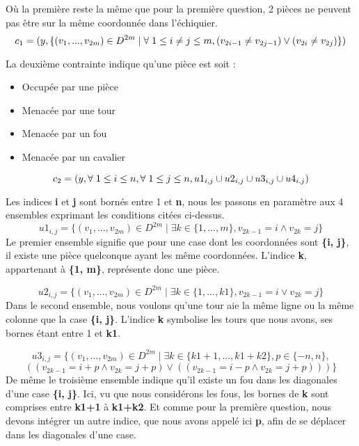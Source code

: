 \documentclass{article}
\begin{document}
Où la première reste la même que pour la première question, 2 pièces ne peuvent pas être sur la même coordonnée dans l'échiquier.\\
$$c_{1} = ( y, \{ (v_{1}, ..., v_{2m}) \in  D^{2m} \mid \forall \hspace{0.1cm} 1\leq i \neq j \leq m, (v_{2i-1} \neq v_{2j-1}) \vee  (v_{2i} \neq v_{2j}) \} )$$ 

La deuxième contrainte indique qu'une pièce est soit :
\begin{itemize}
\item Occupée par une pièce
\item Menacée par une tour
\item Menacée par un fou
\item Menacée par un cavalier
\end{itemize}

$$c_{2} = (y, \forall \hspace{0.1cm} 1 \leq i \leq n, \forall \hspace{0.1cm} 1 \leq j \leq n,  u1_{i,j} \cup u2_{i,j} \cup u3_{i,j} \cup u4_{i,j})$$
    
Les indices \textbf{i} et \textbf{j} sont bornés entre 1 et \textbf{n}, nous les passons en paramètre aux 4 ensembles exprimant les conditions citées ci-dessus. 
\newpage
$$u1_{i,j} = \{(v_{1}, ..., v_{2m}) \in  D^{2m} \mid \exists k \in \{1, ..., m\}, v_{2k-1} = i \wedge v_{2k} = j\}$$
Le premier ensemble signifie que pour une case dont les coordonnées sont \textbf{\{i, j\}}, il existe une pièce quelconque ayant les même coordonnées.
L'indice \textbf{k}, appartenant à \textbf{\{1, m\}}, représente donc une pièce.

$$u2_{i,j} = \{(v_{1}, ..., v_{2m}) \in  D^{2m} \mid \exists k \in \{1, ..., k1\}, v_{2k-1} = i \vee v_{2k} = j\}$$
Dans le second ensemble, nous voulons qu'une tour aie la même ligne ou la même colonne que la case \textbf{\{i, j\}}. L'indice \textbf{k} symbolise les tours que nous avons, ses bornes étant entre 1 et \textbf{k1}.

$$u3_{i,j} = \{(v_{1}, ..., v_{2m}) \in  D^{2m} \mid \exists k \in \{k1+1, ..., k1+k2\}, p \in\{-n, n \},$$
$$ ((v_{2k-1} = i+p \wedge v_{2k} = j+p) \vee ((v_{2k-1} = i-p \wedge v_{2k} = j+p))) \}$$
De même le troisième ensemble indique qu'il existe un fou dans les diagonales d'une case \textbf{\{i, j\}}. Ici, vu que nous considérons les fous, les bornes de \textbf{k} sont comprises entre \textbf{k1+1} à \textbf{k1+k2}. Et comme pour la première question, nous devons intégrer un autre indice, que nous avons appelé ici \textbf{p}, afin de se déplacer dans les diagonales d'une case. 
\end{document}
